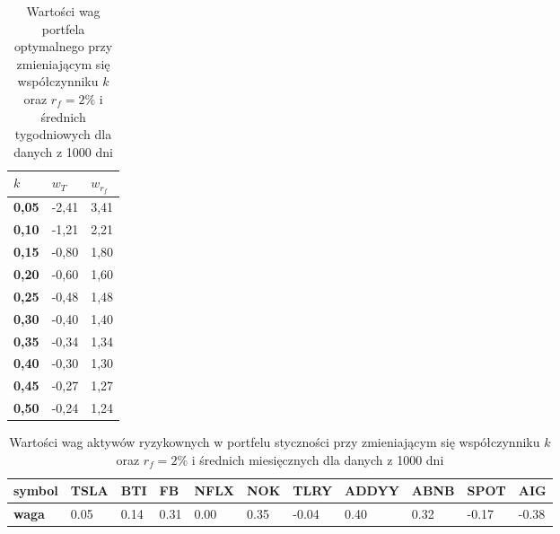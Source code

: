 \documentclass[magister]{dyplom}
\begin{document}
\begin{table}[ht]
	\centering
	\caption{Wartości wag portfela optymalnego przy zmieniającym się współczynniku $k$ oraz $r_f = 2\%$ i średnich tygodniowych dla danych z 1000 dni}
	\begin{tabular}{|l|l|l|}
		\hline
		\textbf{$k$} & \textbf{$w_T$} & \textbf{$w_{r_f}$} \\ \hline
		\textbf{0,05}                                             & -2,41         & 3,41            \\ \hline
		\textbf{0,10}                                             & -1,21         & 2,21            \\ \hline
		\textbf{0,15}                                             & -0,80         & 1,80            \\ \hline
		\textbf{0,20}                                             & -0,60         & 1,60            \\ \hline
		\textbf{0,25}                                             & -0,48         & 1,48            \\ \hline
		\textbf{0,30}                                             & -0,40         & 1,40            \\ \hline
		\textbf{0,35}                                             & -0,34         & 1,34            \\ \hline
		\textbf{0,40}                                             & -0,30         & 1,30            \\ \hline
		\textbf{0,45}                                             & -0,27         & 1,27            \\ \hline
		\textbf{0,50}                                             & -0,24         & 1,24            \\ \hline
	\end{tabular}
\end{table}
\begin{table}[ht]
	\centering
	\caption{Wartości wag aktywów ryzykownych w portfelu styczności przy zmieniającym się współczynniku $k$ oraz $r_f = 2\%$ i średnich miesięcznych dla danych z 1000 dni}
	\begin{tabular}{|l|l|l|l|l|l|l|l|l|l|l|}
		\hline
		\textbf{symbol} & \textbf{TSLA} & \textbf{BTI} & \textbf{FB} & \textbf{NFLX} & \textbf{NOK} & \textbf{TLRY} & \textbf{ADDYY} & \textbf{ABNB} & \textbf{SPOT} & \textbf{AIG} \\ \hline
		\textbf{waga}   & 0.05       & 0.14          & 0.31           & 0.00        & 0.35         & -0.04         & 0.40        & 0.32          & -0.17          & -0.38        \\ \hline
	\end{tabular}
\end{table}
\end{document}
